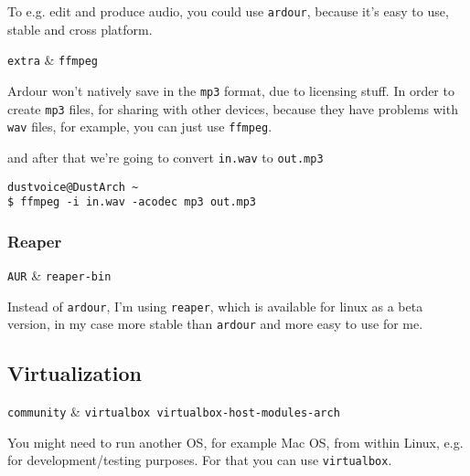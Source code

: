 \documentclass[10pt]{dustdoc}
\begin{document}
To e.g. edit and produce audio, you could use \texttt{ardour}, because it’s easy to use, stable and cross platform.

\begin{NOTE}
    \begin{packagetable}
        \texttt{extra} & \texttt{ffmpeg} \\
    \end{packagetable}

    Ardour won’t natively save in the \texttt{mp3} format, due to licensing stuff.
    In order to create \texttt{mp3} files, for sharing with other devices, because they have problems with \texttt{wav} files, for example, you can just use \texttt{ffmpeg}.

    and after that we’re going to convert \texttt{in.wav} to \texttt{out.mp3}

    \begin{verbatim}
dustvoice@DustArch ~
$ ffmpeg -i in.wav -acodec mp3 out.mp3
    \end{verbatim}
\end{NOTE}


\subsubsection{Reaper}
\label{sec:reaper}

\begin{packagetable}
    \texttt{AUR} & \texttt{reaper-bin} \\
\end{packagetable}

Instead of \texttt{ardour}, I’m using \texttt{reaper}, which is available for linux as a beta version, in my case more stable than \texttt{ardour} and more easy to use for me.

\subsection{Virtualization}
\label{sec:virtualization}

\begin{packagetable}
    \texttt{community} & \texttt{virtualbox virtualbox-host-modules-arch} \\
\end{packagetable}

You might need to run another OS, for example Mac OS, from within Linux, e.g. for development/testing purposes.
For that you can use \texttt{virtualbox}.
\end{document}

